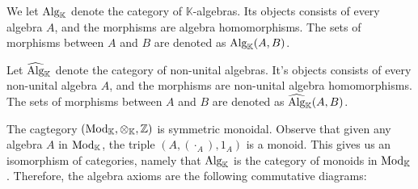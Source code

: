 \documentclass[../thesis.tex]{subfiles}
\begin{document}
            \begin{definition}
                We let $\tt{Alg}_{\mathbb{K}}$ denote the category of $\mathbb{K}$-algebras. Its objects consists of every algebra $A$, and the morphisms are algebra homomorphisms. The sets of morphisms between $A$ and $B$ are denoted as $\tt{Alg}_{\mathbb{K}}(A,B)$.
                
                Let $\widehat{\tt{Alg}}_{\mathbb{K}}$ denote the category of non-unital algebras. It's objects consists of every non-unital algebra $A$, and the morphisms are non-unital algebra homomorphisms. The sets of morphisms between $A$ and $B$ are denoted as $\widehat{\tt{Alg}}_{\mathbb{K}}(A,B)$.
            \end{definition}

            The cagtegory $(\tt{Mod}_\mathbb{K},\otimes_\mathbb{K},\mathbb{Z})$ is symmetric monoidal. Observe that given any algebra $A$ in $\tt{Mod}_\mathbb{K}$, the triple $(A,(\cdot_A),1_A)$ is a monoid. This gives us an isomorphism of categories, namely that $\tt{Alg}_\mathbb{K}$ is the category of monoids in $\tt{Mod}_\mathbb{K}$. Therefore, the algebra axioms are the following commutative diagrams:
            \begin{center}
                 \quad
            \end{center}
\end{document}
